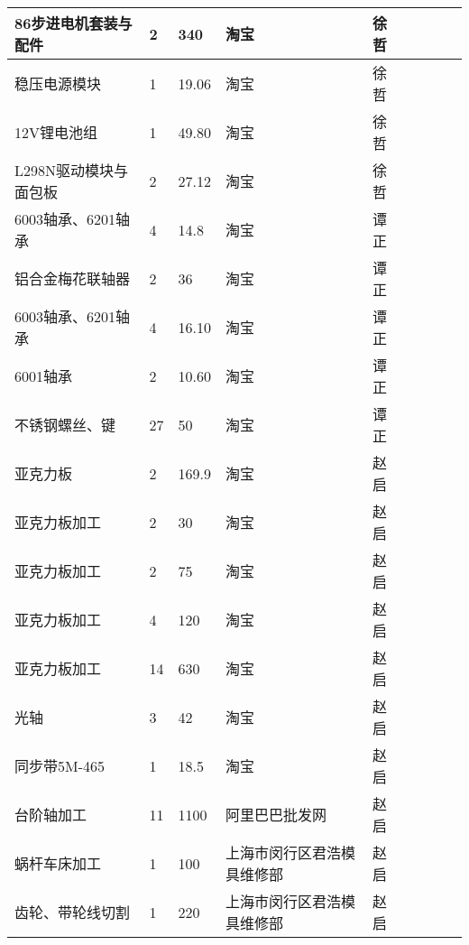 \begin{table}
\begin{tabular}{|l|l|l|l|l|l|l|l|l|}
    86步进电机套装与配件 & 2 & 340 & 淘宝  & 徐哲   \\ \hline
    稳压电源模块 & 1 & 19.06 & 淘宝  & 徐哲  \\ \hline
    12V锂电池组 & 1 & 49.80 & 淘宝  & 徐哲   \\ \hline
    L298N驱动模块与面包板 & 2 & 27.12 & 淘宝  & 徐哲  \\ \hline
    6003轴承、6201轴承 & 4 & 14.8 & 淘宝 & 谭正 \\ \hline
    铝合金梅花联轴器 & 2 & 36 & 淘宝 & 谭正 \\ \hline
    6003轴承、6201轴承 & 4 & 16.10 & 淘宝 & 谭正 \\ \hline
    6001轴承 & 2 & 10.60 & 淘宝 & 谭正 \\ \hline
    不锈钢螺丝、键 & 27 & 50 & 淘宝 & 谭正 \\ \hline
    亚克力板 & 2 & 169.9 & 淘宝 & 赵启 \\ \hline
    亚克力板加工 & 2 & 30 & 淘宝 & 赵启 \\ \hline
    亚克力板加工 & 2 & 75 & 淘宝 & 赵启 \\ \hline
    亚克力板加工 & 4 & 120 & 淘宝 & 赵启 \\ \hline
    亚克力板加工 & 14 & 630 & 淘宝 & 赵启 \\ \hline
    光轴 & 3 & 42 & 淘宝 & 赵启 \\ \hline
    同步带5M-465 & 1 & 18.5 & 淘宝 & 赵启 \\ \hline
    台阶轴加工 & 11 & 1100 & 阿里巴巴批发网 & 赵启 \\ \hline
    蜗杆车床加工 & 1 & 100 & 上海市闵行区君浩模具维修部 & 赵启 \\ \hline
    齿轮、带轮线切割 & 1 & 220 & 上海市闵行区君浩模具维修部 & 赵启 \\ \hline
    
\end{tabular}
\end{table}
    
